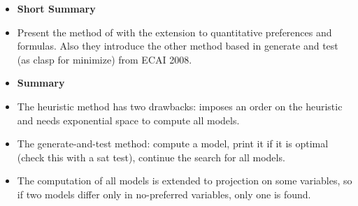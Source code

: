 \begin{itemize}
	\item \textbf{Short Summary}
	\item Present the method of \cite{rogima10a} with 
	      the extension to quantitative preferences and formulas.
	      Also they introduce the other method based in generate and test (as clasp for minimize) from ECAI 2008.
	\item \textbf{Summary}
	\item The heuristic method has two drawbacks: imposes an order on the heuristic and needs exponential space 
				to compute all models.
	\item The generate-and-test method: compute a model, print it if it is optimal (check this with a sat test), continue the search for all models.
	\item The computation of all models is extended to projection on some variables, so if two models differ only in no-preferred variables, 
				only one is found.
\end{itemize}

